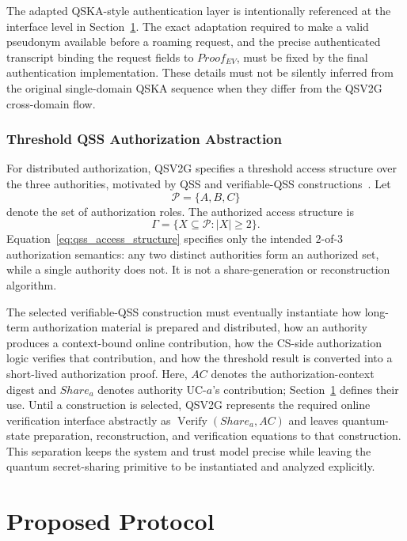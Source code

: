\documentclass[twocolumn,10pt,journal]{IEEEtran}
\begin{document}
The adapted QSKA-style authentication layer is intentionally referenced at the interface level in Section~\ref{sec4}. The exact adaptation required to make a valid pseudonym available before a roaming request, and the precise authenticated transcript binding the request fields to $Proof_{EV}$, must be fixed by the final authentication implementation. These details must not be silently inferred from the original single-domain QSKA sequence when they differ from the QSV2G cross-domain flow.

\subsubsection{Threshold QSS Authorization Abstraction}
For distributed authorization, QSV2G specifies a threshold access structure over the three authorities, motivated by QSS and verifiable-QSS constructions~\cite{cleve1999quantum,benor2006vqss}. Let
\begin{equation}
\mathcal{P}=\{A,B,C\}
\end{equation}
denote the set of authorization roles. The authorized access structure is
\begin{equation}
\Gamma=\{X\subseteq\mathcal{P}:|X|\geq2\}.
\label{eq:qss_access_structure}
\end{equation}
Equation~\eqref{eq:qss_access_structure} specifies only the intended $2$-of-$3$ authorization semantics: any two distinct authorities form an authorized set, while a single authority does not. It is not a share-generation or reconstruction algorithm.

The selected verifiable-QSS construction must eventually instantiate how long-term authorization material is prepared and distributed, how an authority produces a context-bound online contribution, how the CS-side authorization logic verifies that contribution, and how the threshold result is converted into a short-lived authorization proof. Here, $AC$ denotes the authorization-context digest and $Share_a$ denotes authority UC-$a$'s contribution; Section~\ref{sec4} defines their use. Until a construction is selected, QSV2G represents the required online verification interface abstractly as $\operatorname{Verify}(Share_a,AC)$ and leaves quantum-state preparation, reconstruction, and verification equations to that construction. This separation keeps the system and trust model precise while leaving the quantum secret-sharing primitive to be instantiated and analyzed explicitly.

\section{Proposed Protocol}
\label{sec4}
\end{document}
